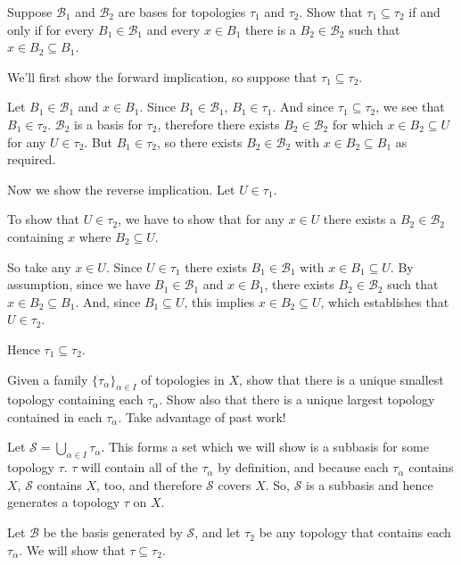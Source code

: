 \documentclass{homework}
\newcommand{\calB}{\mathcal{B}}
\newcommand{\calS}{\mathcal{S}}
\begin{document}
\begin{exercise}{1}
Suppose $\calB_1$ and $\calB_2$ are bases for topologies $\tau_1$
and $\tau_2$.  Show that $\tau_1\subseteq \tau_2$ if and only if
for every $B_1\in \calB_1$ and every $x\in B_1$ there is a $B_2\in \calB_2$
such that $x\in B_2\subseteq B_1$.
\end{exercise}
\solution
We'll first show the forward implication, so suppose that $\tau_1\subseteq\tau_2$.

Let $B_1\in\calB_1$ and $x\in B_1$.  Since $B_1\in\calB_1$, $B_1\in\tau_1$.
And since $\tau_1\subseteq\tau_2$, we see that
$B_1\in\tau_2$.
$\calB_2$ is a basis for $\tau_2$, therefore there exists $B_2\in\calB_2$ for
which $x\in B_2\subseteq U$ for any $U\in\tau_2$.  But $B_1\in\tau_2$, so there
exists $B_2\in\calB_2$ with $x\in B_2\subseteq B_1$ as required.

Now we show the reverse implication.  Let $U\in\tau_1$.

To show that $U\in\tau_2$, we have to show that for any $x\in U$ there exists
a $B_2\in\calB_2$ containing $x$ where $B_2\subseteq U$.

So take any $x\in U$.  Since $U\in\tau_1$ there exists $B_1\in\calB_1$ with
$x\in B_1\subseteq U$.  By assumption, since we have $B_1\in\calB_1$
and $x\in B_1$, there exists $B_2\in\calB_2$ such that $x\in B_2\subseteq B_1$.
And, since $B_1\subseteq U$, this implies $x\in B_2\subseteq U$, which
establishes that $U\in\tau_2$.

Hence $\tau_1\subseteq\tau_2$.

\hrulefill
\begin{exercise}{2}
Given a family $\{\tau_\alpha\}_{\alpha\in I}$ of topologies in $X$,
show that there is a unique smallest topology containing each $\tau_\alpha$.
Show also that there is a unique largest topology contained
in each $\tau_\alpha$.
Take advantage of past work!
\end{exercise}
\solution
Let $\calS=\bigcup_{\alpha\in I} \tau_\alpha$.  This forms a set which we
will show is a subbasis for some topology $\tau$.  $\tau$ will contain
all of the $\tau_\alpha$ by definition,
and because each $\tau_\alpha$ contains $X$,
$\calS$ contains $X$, too, and therefore $\calS$ covers $X$.  So, $\calS$
is a subbasis and hence generates a topology $\tau$ on $X$.

Let $\calB$ be the basis generated by $\calS$, and let $\tau_2$ be any
topology that contains each $\tau_\alpha$. We will show that
$\tau\subseteq\tau_2$.
\end{document}
